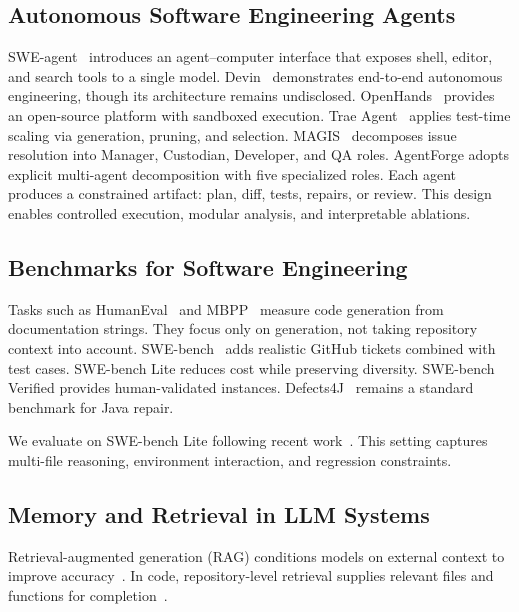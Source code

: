 \documentclass[journal]{IEEEtran}
\begin{document}
\subsection{Autonomous Software Engineering Agents}

SWE-agent~\cite{yang2024sweagent} introduces an agent--computer interface that exposes shell, editor, and search tools to a single model. Devin~\cite{cognition2024devin} demonstrates end-to-end autonomous engineering, though its architecture remains undisclosed. OpenHands~\cite{wang2024openhands} provides an open-source platform with sandboxed execution. Trae Agent~\cite{trae2025} applies test-time scaling via generation, pruning, and selection. MAGIS~\cite{tao2024magis} decomposes issue resolution into Manager, Custodian, Developer, and QA roles.
AgentForge adopts explicit multi-agent decomposition with five specialized roles. Each agent produces a constrained artifact: plan, diff, tests, repairs, or review. This design enables controlled execution, modular analysis, and interpretable ablations.

\subsection{Benchmarks for Software Engineering}

Tasks such as HumanEval~\cite{chen2021codex} and MBPP~\cite{austin2021program} measure code generation from documentation strings. They focus only on generation, not taking repository context into account. SWE-bench~\cite{jimenez2024swebench} adds realistic GitHub tickets combined with test cases. SWE-bench Lite reduces cost while preserving diversity. SWE-bench Verified provides human-validated instances. Defects4J~\cite{defects4j} remains a standard benchmark for Java repair.

We evaluate on SWE-bench Lite following recent work~\cite{yang2024sweagent,wang2024openhands,zhang2024autocoderover}. This setting captures multi-file reasoning, environment interaction, and regression constraints.

\subsection{Memory and Retrieval in LLM Systems}

Retrieval-augmented generation (RAG) conditions models on external context to improve accuracy~\cite{lewis2020rag}. In code, repository-level retrieval supplies relevant files and functions for completion~\cite{zhang2023repocoder,shrivastava2023repofusion}.
\end{document}
